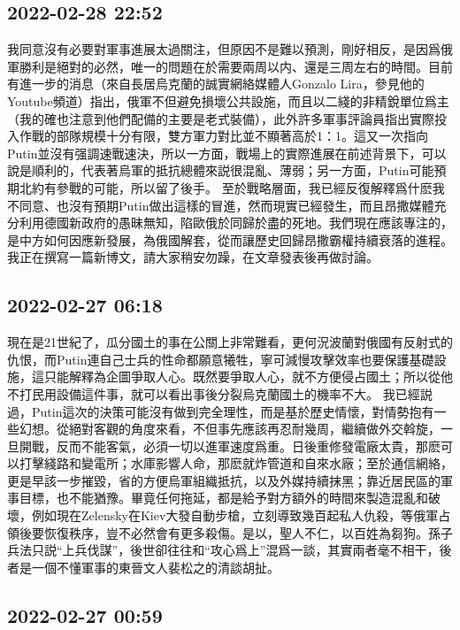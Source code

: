 \documentclass[twocolumn]{ctexart}
\begin{document}
\subsection*{2022-02-28 22:52}

我同意沒有必要對軍事進展太過關注，但原因不是難以預測，剛好相反，是因爲俄軍勝利是絕對的必然，唯一的問題在於需要兩周以内、還是三周左右的時間。目前有進一步的消息（來自長居烏克蘭的誠實網絡媒體人Gonzalo Lira，參見他的Youtube頻道）指出，俄軍不但避免損壞公共設施，而且以二綫的非精銳單位爲主（我的確也注意到他們配備的主要是老式裝備），此外許多軍事評論員指出實際投入作戰的部隊規模十分有限，雙方軍力對比並不顯著高於1：1。這又一次指向Putin並沒有强調速戰速決，所以一方面，戰場上的實際進展在前述背景下，可以說是順利的，代表著烏軍的抵抗總體來説很混亂、薄弱；另一方面，Putin可能預期北約有參戰的可能，所以留了後手。
至於戰略層面，我已經反復解釋爲什麽我不同意、也沒有預期Putin做出這樣的冒進，然而現實已經發生，而且昂撒媒體充分利用德國新政府的愚昧無知，陷歐俄於同歸於盡的死地。我們現在應該專注的，是中方如何因應新發展，為俄國解套，從而讓歷史回歸昂撒霸權持續衰落的進程。我正在撰寫一篇新博文，請大家稍安勿躁，在文章發表後再做討論。
\subsection*{2022-02-27 06:18}

現在是21世紀了，瓜分國土的事在公關上非常難看，更何況波蘭對俄國有反射式的仇恨，而Putin連自己士兵的性命都願意犧牲，寧可減慢攻擊效率也要保護基礎設施，這只能解釋為企圖爭取人心。既然要爭取人心，就不方便侵占國土；所以從他不打民用設備這件事，就可以看出事後分裂烏克蘭國土的機率不大。
我已經説過，Putin這次的決策可能沒有做到完全理性，而是基於歷史情懷，對情勢抱有一些幻想。從絕對客觀的角度來看，不但事先應該再忍耐幾周，繼續做外交斡旋，一旦開戰，反而不能客氣，必須一切以進軍速度爲重。日後重修發電廠太貴，那麽可以打擊綫路和變電所；水庫影響人命，那麽就炸管道和自來水廠；至於通信網絡，更是早該一步摧毀，省的方便烏軍組織抵抗，以及外媒持續抹黑；靠近居民區的軍事目標，也不能猶豫。畢竟任何拖延，都是給予對方額外的時間來製造混亂和破壞，例如現在Zelensky在Kiev大發自動步槍，立刻導致幾百起私人仇殺，等俄軍占領後要恢復秩序，豈不必然會有更多殺傷。是以，聖人不仁，以百姓為芻狗。孫子兵法只説“上兵伐謀”，後世卻往往和“攻心爲上”混爲一談，其實兩者毫不相干，後者是一個不懂軍事的東晉文人裴松之的清談胡扯。
\subsection*{2022-02-27 00:59}
\end{document}
